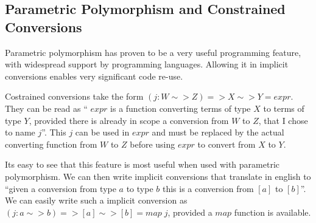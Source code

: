 \subsection{Parametric Polymorphism and Constrained Conversions}
Parametric polymorphism has proven to be a very useful programming feature, with widespread support by programming languages. Allowing it in implicit conversions enables very significant code re-use.

Costrained conversions take the form $(j: W \sim > Z) => X \sim > Y = expr$. They can be read as `` $expr$ is a function converting terms of type $X$ to terms of type $Y$, provided there is already in scope a conversion from $W$ to $Z$, that I chose to name $j$''. This $j$ can be used in $expr$ and must be replaced by the actual converting function from $W$ to $Z$ before using $expr$ to convert from $X$ to $Y$.

Its easy to see that this feature is most useful when used with parametric polymorphism. We can then write implicit conversions that translate in english to ``given a conversion from type $a$ to type $b$ this is a conversion from $[a]$ to $[b]$''. We can easily write such a implicit conversion as $(j: a \sim > b) => [a] \sim > [b] = map\; j$, provided a $map$ function is available.
